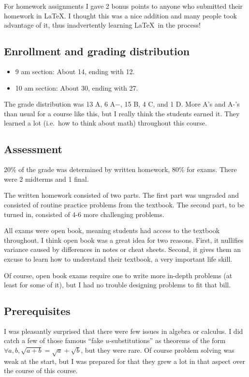 \documentclass[11pt,oneside]{amsart}
\begin{document}
For homework assignments I gave 2 bonus points to anyone who submitted their homework in \LaTeX. I thought this was a nice addition and many people took advantage of it, thus inadvertently learning \LaTeX\ in the process!

\subsection{Enrollment and grading distribution}
\begin{itemize}
  \item 9 am section: About 14, ending with 12.
  \item 10 am section: About 30, ending with 27.
\end{itemize}
The grade distribution was 13 A, 6 A$-$, 15 B, 4 C, and 1 D. More A's and A-'s than usual for a course like this, but I really think the students earned it. They learned a lot (i.e.\ how to think about math) throughout this course.

\subsection{Assessment}
20\% of the grade was determined by written homework, 80\% for exams. There were 2 midterms and 1 final.

The written homework consisted of two parts. The first part was ungraded and consisted of routine practice problems from the textbook. The second part, to be turned in, consisted of 4-6 more challenging problems.

All exams were open book, meaning students had access to the textbook throughout. I think open book was a great idea for two reasons. First, it nullifies variance caused by differences in notes or cheat sheets. Second, it gives them an excuse to learn how to understand their textbook, a very important life skill.

Of course, open book exams require one to write more in-depth problems (at least for some of it), but I had no trouble designing problems to fit that bill.

\subsection{Prerequisites}
I was pleasantly surprised that there were few issues in algebra or calculus. I did catch a few of those famous ``fake $u$-substitutions'' as theorems of the form $\forall a,b,\sqrt{a+b}=\sqrt a+\sqrt b$, but they were rare. Of course problem solving was weak at the start, but I was prepared for that they grew a lot in that aspect over the course of this course.
\end{document}
